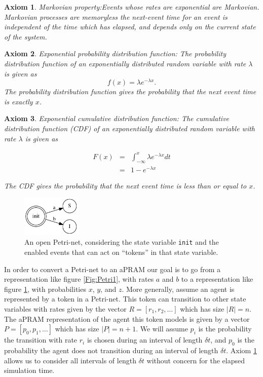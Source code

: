 \documentclass[12pt]{galois-whitepaper}
\theoremstyle{plain}
\newtheorem{axiom}{Axiom}[section]
\begin{document}
\begin{axiom}{Markovian property:}\label{Axiom:Markov}
  Events whose rates are exponential are Markovian.  Markovian
  processes are \emph{memoryless} the next-event time for an event is
  independent of the time which has elapsed, and depends only on the
  current state of the system.
\end{axiom}

\begin{axiom}{Exponential probability distribution function:}
  The probability distribution function of an exponentially
  distributed random variable with rate $\lambda$ is given as \[f(x) =
    \lambda e^{-\lambda x}.\]  The probability distribution function
  gives the probability that the next event time is exactly $x$.
\end{axiom}

\begin{axiom}{Exponential cumulative distribution function:}
The cumulative distribution function (CDF) of an exponentially distributed
random variable with rate $\lambda$ is given as

\begin{eqnarray}
  F(x) &=& \int_{-\infty}^{x} \lambda e^{-\lambda x} dt \\
  &=& 1 - e^{-\lambda x}
\end{eqnarray}

The CDF gives the probability that the next event time is less than or
equal to $x$.
\end{axiom}

\begin{figure}
  \centering
  \includegraphics[width=0.25\textwidth]{agent-single-move.png}
  \caption{An open Petri-net, considering the state variable
    \texttt{init} and the enabled events that can act on ``tokens'' in
    that state variable.}
  \label{Fig:aPRAM1}
\end{figure}

In order to convert a Petri-net to an aPRAM our goal is to go from a
representation like figure \ref{Fig:Petri1}, with rates $a$ and $b$
to a representation like figure \ref{Fig:aPRAM1}, with probabilities
$x$, $y$, and $z$.  More generally, assume an agent is represented by
a token in a Petri-net.  This token can transition to other state
variables with rates given by the vector $R = [r_1, r_2, \ldots]$
which has size $|R| = n$.  The aPRAM representation of the agent this
token models is given by a vector $P = [p_0, p_1, \ldots]$ which has
size $|P| = n+1$.  We will assume $p_i$ is the probability the
transition with rate $r_i$ is chosen during an interval of length
$\delta t$, and $p_0$ is the probability the
agent does not transition during an interval of length $\delta t$.
Axiom \ref{Axiom:Markov} allows us to consider all intervals of length
$\delta t$ without concern for the elapsed simulation time.


\end{document}
